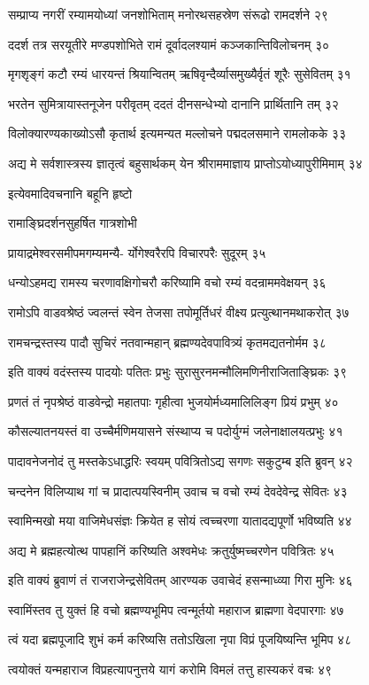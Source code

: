 सम्प्राप्य नगरीं रम्यामयोध्यां जनशोभिताम्
मनोरथसहस्रेण संरूढो रामदर्शने २९

ददर्श तत्र सरयूतीरे मण्डपशोभिते
रामं दूर्वादलश्यामं कञ्जकान्तिविलोचनम् ३०

मृगशृङ्गं कटौ रम्यं धारयन्तं श्रियान्वितम्
ऋषिवृन्दैर्व्यासमुख्यैर्वृतं शूरैः सुसेवितम् ३१

भरतेन सुमित्रायास्तनूजेन परीवृतम्
ददतं दीनसन्धेभ्यो दानानि प्रार्थितानि तम् ३२

विलोक्यारण्यकाख्योऽसौ कृतार्थ इत्यमन्यत
मल्लोचने पद्मदलसमाने रामलोकके ३३

अद्य मे सर्वशास्त्रस्य ज्ञातृत्वं बहुसार्थकम्
येन श्रीराममाज्ञाय प्राप्तोऽयोध्यापुरीमिमाम् ३४

इत्येवमादिवचनानि बहूनि हृष्टो

रामाङ्घ्रिदर्शनसुहर्षित गात्रशोभी

प्रायाद्रमेश्वरसमीपमगम्यमन्यै-
र्योगेश्वरैरपि विचारपरैः सुदूरम् ३५

धन्योऽहमद्य रामस्य चरणावक्षिगोचरौ
करिष्यामि वचो रम्यं वदन्राममवेक्षयन् ३६

रामोऽपि वाडवश्रेष्ठं ज्वलन्तं स्वेन तेजसा
तपोमूर्तिधरं वीक्ष्य प्रत्युत्थानमथाकरोत् ३७

रामचन्द्रस्तस्य पादौ सुचिरं नतवान्महान्
ब्रह्मण्यदेवपावित्र्यं कृतमद्यतनोर्मम ३८

इति वाक्यं वदंस्तस्य पादयोः पतितः प्रभुः
सुरासुरनमन्मौलिमणिनीराजिताङ्घ्रिकः ३९

प्रणतं तं नृपश्रेष्ठं वाडवेन्द्रो महातपाः
गृहीत्वा भुजयोर्मध्यमालिलिङ्ग प्रियं प्रभुम् ४०

कौसल्यातनयस्तं वा उच्चैर्मणिमयासने
संस्थाप्य च पदोर्युग्मं जलेनाक्षालयत्प्रभुः ४१

पादावनेजनोदं तु मस्तकेऽधाद्धरिः स्वयम्
पवित्रितोऽद्य सगणः सकुटुम्ब इति ब्रुवन् ४२

चन्दनेन विलिप्याथ गां च प्रादात्पयस्विनीम्
उवाच च वचो रम्यं देवदेवेन्द्र सेवितः ४३

स्वामिन्मखो मया वाजिमेधसंज्ञः क्रियेत ह
सोयं त्वच्चरणा यातादद्यपूर्णो भविष्यति ४४

अद्य मे ब्रह्महत्योत्थ पापहानिं करिष्यति
अश्वमेधः क्रतुर्युष्मच्चरणेन पवित्रितः ४५

इति वाक्यं ब्रुवाणं तं राजराजेन्द्रसेवितम्
आरण्यक उवाचेदं हसन्माध्व्या गिरा मुनिः ४६

स्वामिंस्तव तु युक्तं हि वचो ब्रह्मण्यभूमिप
त्वन्मूर्तयो महाराज ब्राह्मणा वेदपारगाः ४७

त्वं यदा ब्रह्मपूजादि शुभं कर्म करिष्यसि
ततोऽखिला नृपा विप्रं पूजयिष्यन्ति भूमिप ४८

त्वयोक्तं यन्महाराज विप्रहत्यापनुत्तये
यागं करोमि विमलं तत्तु हास्यकरं वचः ४९

